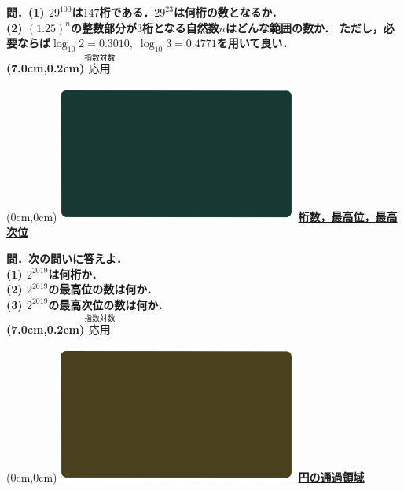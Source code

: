 \documentclass[10pt,
fleqn,
dvipdfmx,
uplatex
]{jsarticle}
\begin{document}
\normalsize 
\bf\boldmath 問．(1)  ${29}^{100}$は${147}$桁である．${29}^{23}$は何桁の数となるか．\\
(2)  $\left(1.{25}\right)^n$の整数部分が$3$桁となる自然数$n$はどんな範囲の数か．
ただし，必要ならば$\log _{10}2=0.{3010},\;\log _{10}3=0.{4771}$を用いて良い．\\

\at(7.0cm,0.2cm){\small\color{bradorange}$\overset{\text{指数対数}}{\text{応用}}$}


\newpage



\at(0cm,0cm){\includegraphics[width=8cm,bb=0 0 1920 1080]{./youtube/thumbnails/templates/smart_background/指数対数.jpeg}}
{\color{orange}\bf\boldmath\LARGE\underline{桁数，最高位，最高次位}}\vspace{0.3zw}

\Large 
\bf\boldmath 問．次の問いに答えよ．\\
(1)  $2^{{2019}}$は何桁か．\\
(2)  $2^{{2019}}$の最高位の数は何か．\\
(3)  $2^{{2019}}$の最高次位の数は何か．\\

\at(7.0cm,0.2cm){\small\color{bradorange}$\overset{\text{指数対数}}{\text{応用}}$}


\newpage



\at(0cm,0cm){\includegraphics[width=8cm,bb=0 0 1920 1080]{./youtube/thumbnails/templates/smart_background/図形と方程式.jpeg}}
{\color{orange}\bf\boldmath\huge\underline{円の通過領域}}\vspace{0.3zw}
\end{document}
